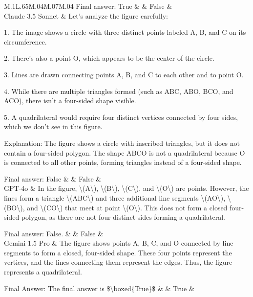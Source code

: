 \begin{table*}[t]
\begin{tabular}{M{.1\linewidth}L{.65\linewidth}M{.04\linewidth}M{.07\linewidth}M{.04\linewidth}}
Final answer: True & \cmark & False & \xmark \\
\midrule
Claude 3.5 Sonnet & Let's analyze the figure carefully:

1. The image shows a circle with three distinct points labeled A, B, and C on its circumference.

2. There's also a point O, which appears to be the center of the circle.

3. Lines are drawn connecting points A, B, and C to each other and to point O.

4. While there are multiple triangles formed (such as ABC, ABO, BCO, and ACO), there isn't a four-sided shape visible.

5. A quadrilateral would require four distinct vertices connected by four sides, which we don't see in this figure.

Explanation: The figure shows a circle with inscribed triangles, but it does not contain a four-sided polygon. The shape ABCO is not a quadrilateral because O is connected to all other points, forming triangles instead of a four-sided shape.

Final answer: False & \xmark & False & \xmark \\
\midrule
GPT-4o & In the figure, \textbackslash (A\textbackslash ), \textbackslash (B\textbackslash ), \textbackslash (C\textbackslash ), and \textbackslash (O\textbackslash ) are points. However, the lines form a triangle \textbackslash (ABC\textbackslash ) and three additional line segments \textbackslash (AO\textbackslash ), \textbackslash (BO\textbackslash ), and \textbackslash (CO\textbackslash ) that meet at point \textbackslash (O\textbackslash ). This does not form a closed four-sided polygon, as there are not four distinct sides forming a quadrilateral.

Final answer: False. & \xmark & False & \xmark \\
\midrule
Gemini 1.5 Pro & The figure shows points A, B, C, and O connected by line segments to form a closed, four-sided shape.  These four points represent the vertices, and the lines connecting them represent the edges. Thus, the figure represents a quadrilateral.

Final Answer: The final answer is \$\textbackslash boxed\{True\}\$ & \cmark & True
 & \cmark \\
\bottomrule
    \end{tabular}
    \caption{Examples of dataset and model responses for \texttt{Geometry-Quadrilateral} (1)} \label{tab:examples_Geometry-Quadrilateral_1}%
\end{table*}
